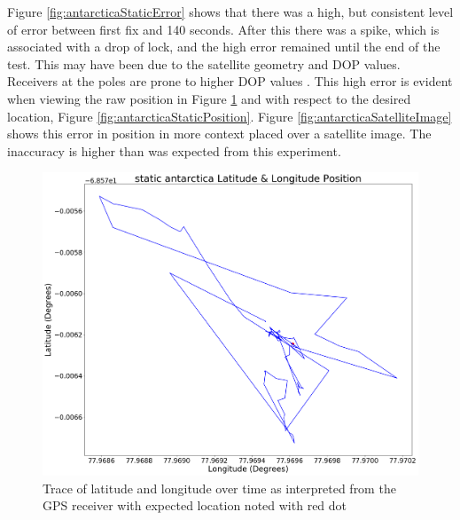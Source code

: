 Figure \ref{fig:antarcticaStaticError} shows that there was a high, but consistent level of error between first fix
and 140 seconds. After this there was a spike, which is associated with a drop of lock, and the high error remained until the end of the test. This may have been due to
the satellite geometry and DOP values. Receivers at the poles are prone to higher DOP values \cite{RN62}. This high error is evident
when viewing the raw position in Figure \ref{fig:antarcticaStaticCoord} and with respect to the desired location, Figure \ref{fig:antarcticaStaticPosition}. Figure \ref{fig:antarcticaSatelliteImage} shows this error
in position in more context placed over a satellite image.
The inaccuracy is higher than was expected from this experiment.  

\begin{figure}[H]
    \begin{centering}
        \includegraphics[width=12cm,keepaspectratio]{Figures/2021_3_30_static_antarctica Lat long position.png}
        \caption{Trace of latitude and longitude over time as interpreted from the GPS receiver with expected location noted with red dot}
        \label{fig:antarcticaStaticCoord}
    \end{centering}
\end{figure}

